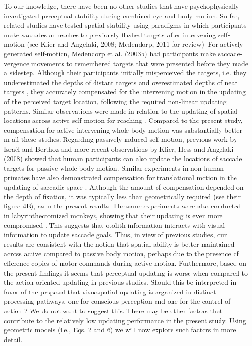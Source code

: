 To our knowledge, there have been no other studies that have psychophysically investigated perceptual stability during combined eye and body motion. So far, related studies have tested spatial stability using paradigms in which participants make saccades or reaches to previously flashed targets after intervening self-motion (see Klier and Angelaki, 2008; Medendorp, 2011 for review). 
For actively generated self-motion, Medendorp et al. (2003b) had participants make saccade-vergence movements to remembered targets that were presented before they made a sidestep. Although their participants initially misperceived the targets, i.e. they underestimated the depths of distant targets and overestimated depths of near targets \cite{gogel1977, komoda1974, philbeck1997}, they accurately compensated for the intervening motion in the updating of the perceived target location, following the required non-linear updating patterns. Similar observations were made in relation to the updating of spatial locations across active self-motion for reaching \cite{admiraal2004, flanders1999, medendorp1999, vanpelt2007}. Compared to the present study, compensation for active intervening whole body motion was substantially better in all these studies.
Regarding passively induced self-motion, previous work by Isra\"el and Berthoz \nocite{israel1989} and more recent observations by Klier, Hess and Angelaki (2008) showed that human participants can also update the locations of saccade targets for passive whole body motion. Similar experiments in non-human primates have also demonstrated compensation for translational motion in the updating of saccadic space \cite{li2005a}. Although the amount of compensation depended on the depth of fixation, it was typically less than geometrically required (see their figure 4B), as in the present results. The same experiments were also conducted in labyrinthectomized monkeys, showing that their updating is even more compromised \cite{li2005b, wei2006}. This suggests that otolith information interacts with visual information to update saccade goals. 
Thus, in view of previous studies, our results are consistent with the notion that spatial ability is better maintained across active compared to passive body motion, perhaps due to the presence of efference copies of motor commands during active motion. Furthermore, based on the present findings it seems that perceptual updating is worse when compared to the action-oriented updating in previous studies. Should this be interpreted in favor of the proposal that visuospatial updating is organized in distinct processing pathways, one for conscious perception and one for the control of action \cite{goodale1992}? We do not want to suggest this. There may be other factors that contribute to the relatively low updating performance in the present study. Using geometric models (i.e., Eqs. 2 and 6) we will now explore such factors in more detail.

